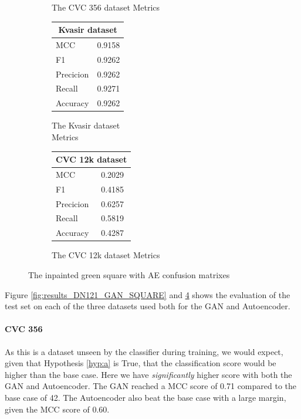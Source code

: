\begin{figure}
\begin{subfigure}[b]{0.25\textwidth}
\begin{tabular}{ll}
        \end{tabular}
\caption{The CVC 356 dataset Metrics}
\label{tab:cvc356_metrics_DN121_AE_SQUARE}
\end{subfigure}%
\begin{subfigure}[b]{0.49\textwidth}
    	\centering
        \begin{tabular}{ll}
        \toprule
        \multicolumn{2}{c}{Kvasir dataset}        \\
        \midrule
        MCC 		& 0.9158 \\
        F1  		& 0.9262  \\
        Precicion  	& 0.9262 \\
        Recall     	& 0.9271  \\
        Accuracy	& 0.9262 \\
        \bottomrule
\end{tabular}
\caption{The Kvasir dataset\\ Metrics}
\label{tab:kvasir_metrics_DN121_AE_SQUARE}
\end{subfigure}%
\begin{subfigure}[b]{0.25\textwidth}
        \begin{tabular}{ll}
        \toprule
        \multicolumn{2}{c}{CVC 12k dataset}        \\
        \midrule
        MCC 		& 0.2029 \\
        F1  		& 0.4185  \\
        Precicion  	& 0.6257 \\
        Recall     	& 0.5819 \\
        Accuracy	& 0.4287 \\
        \bottomrule
        \end{tabular}
\caption{The CVC 12k dataset Metrics}
\label{tab:cvc12k_metrics_DN121_AE_SQUARE}
\end{subfigure}
\caption{The inpainted green square with AE confusion matrixes}
\label{fig:results_DN121_AE_SQUARE}
\end{figure}
\FloatBarrier

%
Figure \ref{fig:results_DN121_GAN_SQUARE} and \ref{fig:results_DN121_AE_SQUARE} shows the evaluation of the test set on each of the three datasets used both for the GAN and Autoencoder. 

\paragraph{CVC 356}
As this is a dataset unseen by the classifier during training, we would expect, given that Hypothesis \ref{hyp:a} is True, that the classification score would be higher than the base case.
Here we have \textit{significantly} higher score with both the GAN and Autoencoder. 
The GAN reached a MCC score of 0.71 compared to the base case of 42. The Autoencoder also beat the base case with a large margin, given the MCC score of 0.60.

